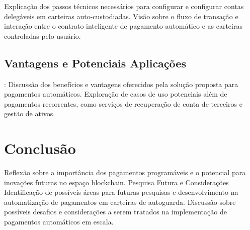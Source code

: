 \documentclass[12pt]{article}
\begin{document}
Explicação dos passos técnicos necessários para configurar e configurar contas delegáveis em
carteiras auto-custodiadas. Visão sobre o fluxo de transação e interação entre o contrato
inteligente de pagamento automático e as carteiras controladas pelo usuário.

\subsection{Vantagens e Potenciais Aplicações}:
Discussão dos benefícios e vantagens oferecidos pela solução proposta para pagamentos automáticos.
Exploração de casos de uso potenciais além de pagamentos recorrentes, como serviços de recuperação de conta de terceiros e gestão de ativos.

\section{Conclusão}\label{sec:conclusao}

Reflexão sobre a importância dos pagamentos programáveis e o potencial para inovações futuras no
espaço blockchain. Pesquisa Futura e Considerações Identificação de possíveis áreas para futuras
pesquisas e desenvolvimento na automatização de pagamentos em carteiras de autoguarda. Discussão
sobre possíveis desafios e considerações a serem tratados na implementação de pagamentos
automáticos em escala.



\end{document}
